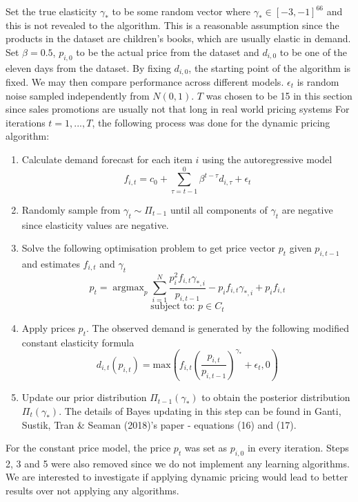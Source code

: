 \documentclass[a4paper]{article}
\DeclareMathOperator*{\argmax}{argmax}
\begin{document}
\newline
\newline
Set the true elasticity $\gamma_*$ to be some random vector where $\gamma_* \in [-3, -1]^{66}$ and this is not revealed to the algorithm. This is a reasonable assumption since the products in the dataset are children's books, which are usually elastic in demand. Set $\beta=0.5$, $p_{i,0}$ to be the actual price from the dataset and $d_{i,0}$ to be one of the eleven days from the dataset. By fixing $d_{i,0}$, the starting point of the algorithm is fixed. We may then compare performance across different models. $\epsilon_t$ is random noise sampled independently from $N(0,1)$. $T$ was chosen to be 15 in this section since sales promotions are usually not that long in real world pricing systems
\newline
\newline
For iterations $t = 1,...,T$, the following process was done for the dynamic pricing algorithm:
\begin{enumerate}
	\item Calculate demand forecast for each item $i$ using the autoregressive model \[ f_{i,t} = c_0 + \sum_{\tau=t-1}^{0} \beta^{t-\tau}d_{i,\tau} + \epsilon_t \]
	\item Randomly sample from $\gamma_t \sim \Pi_{t-1}$ until all components of $\gamma_t$ are negative since elasticity values are negative.
	\item Solve the following optimisation problem to get price vector $p_t$ given $p_{i,t-1}$ and estimates $f_{i,t}$ and $\gamma_t$ \[p_t = \argmax_p \sum_{i=1}^{N}\frac{p_i^2f_{i,t}\gamma_{*,i}}{p_{i,t-1}} -p_if_{i,t}\gamma_{*,i} + p_if_{i,t}\] \[\text{subject to: } p \in C_t \]
	\item Apply prices $p_t$. The observed demand is generated by the following modified constant elasticity formula \[ d_{i,t}(p_{i,t}) = \text{max} \left(f_{i,t}\left(\frac{p_{i,t}}{p_{i,t-1}}\right)^{\gamma_*} + \epsilon_t, 0 \right) \] 
	\item Update our prior distribution $\Pi_{t-1}(\gamma_*)$ to obtain the posterior distribution $\Pi_t(\gamma_*)$. The details of Bayes updating in this step can be found in  Ganti, Sustik, Tran \& Seaman (2018)'s paper - equations (16) and (17).
\end{enumerate}
For the constant price model, the price $p_t$ was set as $p_{i,0}$ in every iteration. Steps 2, 3 and 5 were also removed since we do not implement any learning algorithms. We are interested to investigate if applying dynamic pricing would lead to better results over not applying any algorithms.
\end{document}
